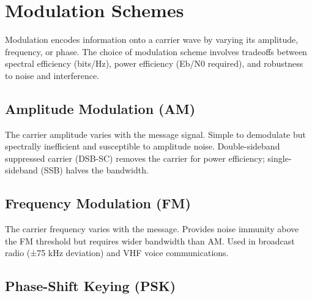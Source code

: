\section{Modulation Schemes}\label{sec:wiki_modulation}



Modulation encodes information onto a carrier wave by varying its amplitude, frequency, or phase. The choice of modulation scheme involves tradeoffs between spectral efficiency (bits/Hz), power efficiency (Eb/N0 required), and robustness to noise and interference.

				

\subsection{Amplitude Modulation (AM)}

				

The carrier amplitude varies with the message signal. Simple to demodulate but spectrally inefficient and susceptible to amplitude noise. Double-sideband suppressed carrier (DSB-SC) removes the carrier for power efficiency; single-sideband (SSB) halves the bandwidth.


				

\subsection{Frequency Modulation (FM)}

				

The carrier frequency varies with the message. Provides noise immunity above the FM threshold but requires wider bandwidth than AM. Used in broadcast radio (±75 kHz deviation) and VHF voice communications.

				

\subsection{Phase-Shift Keying (PSK)}

				


				

